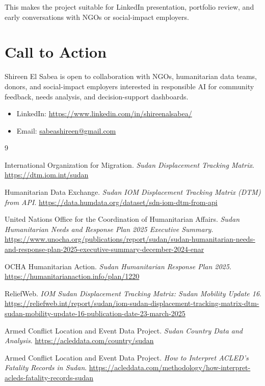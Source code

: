\documentclass[11pt,a4paper]{article}
\begin{document}
This makes the project suitable for LinkedIn presentation, portfolio review, and early conversations with NGOs or social-impact employers.

\section{Call to Action}

Shireen El Sabea is open to collaboration with NGOs, humanitarian data teams, donors, and social-impact employers interested in responsible AI for community feedback, needs analysis, and decision-support dashboards.

\begin{itemize}
  \item LinkedIn: \href{https://www.linkedin.com/in/shireenalsabea/}{https://www.linkedin.com/in/shireenalsabea/}
  \item Email: \href{mailto:sabeashireen@gmail.com}{sabeashireen@gmail.com}
\end{itemize}

\begin{thebibliography}{9}

International Organization for Migration.
\textit{Sudan Displacement Tracking Matrix}.
\url{https://dtm.iom.int/sudan}

Humanitarian Data Exchange.
\textit{Sudan IOM Displacement Tracking Matrix (DTM) from API}.
\url{https://data.humdata.org/dataset/sdn-iom-dtm-from-api}

United Nations Office for the Coordination of Humanitarian Affairs.
\textit{Sudan Humanitarian Needs and Response Plan 2025 Executive Summary}.
\url{https://www.unocha.org/publications/report/sudan/sudan-humanitarian-needs-and-response-plan-2025-executive-summary-december-2024-enar}

OCHA Humanitarian Action.
\textit{Sudan Humanitarian Response Plan 2025}.
\url{https://humanitarianaction.info/plan/1220}

ReliefWeb.
\textit{IOM Sudan Displacement Tracking Matrix: Sudan Mobility Update 16}.
\url{https://reliefweb.int/report/sudan/iom-sudan-displacement-tracking-matrix-dtm-sudan-mobility-update-16-publication-date-23-march-2025}

Armed Conflict Location and Event Data Project.
\textit{Sudan Country Data and Analysis}.
\url{https://acleddata.com/country/sudan}

Armed Conflict Location and Event Data Project.
\textit{How to Interpret ACLED's Fatality Records in Sudan}.
\url{https://acleddata.com/methodology/how-interpret-acleds-fatality-records-sudan}

\end{thebibliography}
\end{document}
